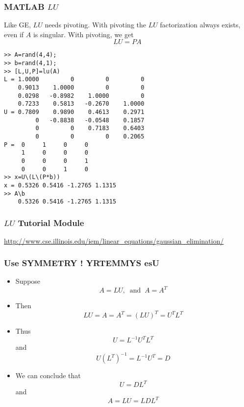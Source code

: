 \documentclass[10pt]{beamer}
\begin{document}
\begin{frame}
\frametitle{MATLAB $LU$}
Like GE, $LU$ needs pivoting.  With pivoting the $LU$ factorization always
exists, even if $A$ is singular.  With pivoting, we get
\[ LU = PA\]
\begin{lstlisting}
>> A=rand(4,4);
>> b=rand(4,1);
>> [L,U,P]=lu(A)
L = 1.0000         0         0         0
    0.9013    1.0000         0         0
    0.0298   -0.8982    1.0000         0
    0.7233    0.5813   -0.2670    1.0000
U = 0.7809    0.9890    0.4613    0.2971
         0   -0.8838   -0.0548    0.1857
         0         0    0.7183    0.6403
         0         0         0    0.2065
P =  0     1     0     0
     1     0     0     0
     0     0     0     1
     0     0     1     0
>> x=U\(L\(P*b)) 
x = 0.5326 0.5416 -1.2765 1.1315
>> A\b
    0.5326 0.5416 -1.2765 1.1315
\end{lstlisting}
\end{frame}
\begin{frame}
\frametitle{$LU$ Tutorial Module}
\begin{center}
\small
\url{http://www.cse.illinois.edu/iem/linear_equations/gaussian_elimination/}
\end{center}
\end{frame}
\begin{frame}
\frametitle{Use SYMMETRY ! YRTEMMYS esU}
\begin{itemize}
    \item Suppose \[A = LU, \;\; \mbox{and} \;\; A = A^T\]
    \item Then 
          \[ LU = A = A^T = (LU)^T = U^T L^T \]
    \item Thus 
          \[ U = L^{-1} U^T L^T \]
          and 
          \[ U (L^{T})^{-1} = L^{-1} U^T = D \]
    \item We can conclude that 
          \[ U = DL^T \]
          and
          \[ A = LU = L D L^T \]
\end{itemize}
\end{frame}
\end{document}
